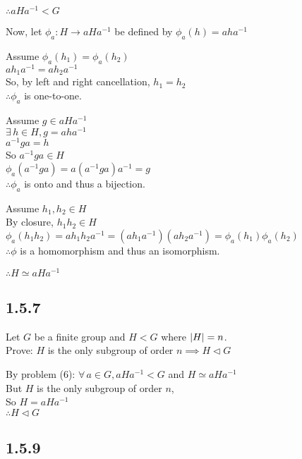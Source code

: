 \documentclass[letterpaper,12pt,fleqn]{article}
\newcommand{\n}{\mathrel{\triangleleft}}
\newcommand{\p}{\phi}
\begin{document}
$\therefore aHa^{-1}<G$

Now, let $\p_a:H\to aHa^{-1}$ be defined by $\p_a(h)=aha^{-1}$

Assume $\p_a(h_1)=\p_a(h_2)$ \\
$ah_1a^{-1}=ah_2a^{-1}$ \\
So, by left and right cancellation, $h_1=h_2$ \\
$\therefore\p_a$ is one-to-one.

Assume $g\in aHa^{-1}$ \\
$\exists\,h\in H,g=aha^{-1}$ \\
$a^{-1}ga=h$ \\
So $a^{-1}ga\in H$ \\
$\p_a(a^{-1}ga)=a(a^{-1}ga)a^{-1}=g$ \\
$\therefore\p_a$ is onto and thus a bijection.

Assume $h_1,h_2\in H$ \\
By closure, $h_1h_2\in H$ \\
$\p_a(h_1h_2)=ah_1h_2a^{-1}=(ah_1a^{-1})(ah_2a^{-1})=\p_a(h_1)\p_a(h_2)$ \\
$\therefore\p$ is a homomorphism and thus an isomorphism.

$\therefore H\simeq aHa^{-1}$

\subsection*{1.5.7}

Let $G$ be a finite group and $H<G$ where $\lvert H\rvert=n$. \\
Prove: $H$ is the only subgroup of order $n\implies H\n G$

By problem (6): $\forall\,a\in G,aHa^{-1}<G$ and $H\simeq aHa^{-1}$ \\
But $H$ is the only subgroup of order $n$, \\
So $H=aHa^{-1}$ \\
$\therefore H\n G$

\subsection*{1.5.9}
\end{document}
